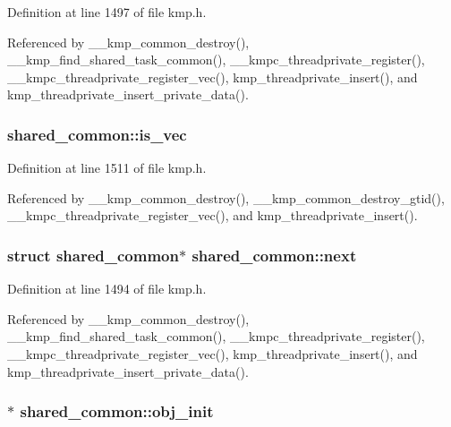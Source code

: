 Definition at line 1497 of file kmp.\-h.



Referenced by \-\_\-\-\_\-kmp\-\_\-common\-\_\-destroy(), \-\_\-\-\_\-kmp\-\_\-find\-\_\-shared\-\_\-task\-\_\-common(), \-\_\-\-\_\-kmpc\-\_\-threadprivate\-\_\-register(), \-\_\-\-\_\-kmpc\-\_\-threadprivate\-\_\-register\-\_\-vec(), kmp\-\_\-threadprivate\-\_\-insert(), and kmp\-\_\-threadprivate\-\_\-insert\-\_\-private\-\_\-data().

\hypertarget{structshared__common_affe99e67b32f42b3bae07c95c59d8f24}{
\subsubsection[{is\-\_\-vec}]{ shared\-\_\-common\-::is\-\_\-vec}}\label{structshared__common_affe99e67b32f42b3bae07c95c59d8f24}


Definition at line 1511 of file kmp.\-h.



Referenced by \-\_\-\-\_\-kmp\-\_\-common\-\_\-destroy(), \-\_\-\-\_\-kmp\-\_\-common\-\_\-destroy\-\_\-gtid(), \-\_\-\-\_\-kmpc\-\_\-threadprivate\-\_\-register\-\_\-vec(), and kmp\-\_\-threadprivate\-\_\-insert().

\hypertarget{structshared__common_aa54da923f39ba340f472b4a62205b967}{
\subsubsection[{next}]{\setlength{\rightskip}{0pt plus 5cm}struct {\bf shared\-\_\-common}$\ast$ shared\-\_\-common\-::next}}\label{structshared__common_aa54da923f39ba340f472b4a62205b967}


Definition at line 1494 of file kmp.\-h.



Referenced by \-\_\-\-\_\-kmp\-\_\-common\-\_\-destroy(), \-\_\-\-\_\-kmp\-\_\-find\-\_\-shared\-\_\-task\-\_\-common(), \-\_\-\-\_\-kmpc\-\_\-threadprivate\-\_\-register(), \-\_\-\-\_\-kmpc\-\_\-threadprivate\-\_\-register\-\_\-vec(), kmp\-\_\-threadprivate\-\_\-insert(), and kmp\-\_\-threadprivate\-\_\-insert\-\_\-private\-\_\-data().

\hypertarget{structshared__common_a5afc5429e242b0940b1624352aa7df79}{
\subsubsection[{obj\-\_\-init}]{$\ast$ shared\-\_\-common\-::obj\-\_\-init}}\label{structshared__common_a5afc5429e242b0940b1624352aa7df79}


